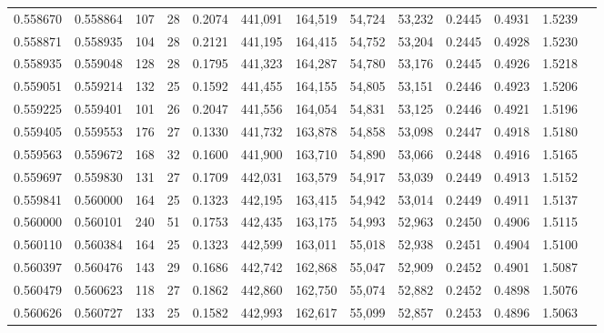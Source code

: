 \begin{tabular}{rrrrrrrrrrrrr}
0.558670 & 0.558864 &    107 &    28 &                                     0.2074 & 441,091 & 164,519 &  54,724 &  53,232 & 0.2445 & 0.4931 & 1.5239 \\
0.558871 & 0.558935 &    104 &    28 &                                     0.2121 & 441,195 & 164,415 &  54,752 &  53,204 & 0.2445 & 0.4928 & 1.5230 \\
0.558935 & 0.559048 &    128 &    28 &                                     0.1795 & 441,323 & 164,287 &  54,780 &  53,176 & 0.2445 & 0.4926 & 1.5218 \\
0.559051 & 0.559214 &    132 &    25 &                                     0.1592 & 441,455 & 164,155 &  54,805 &  53,151 & 0.2446 & 0.4923 & 1.5206 \\
0.559225 & 0.559401 &    101 &    26 &                                     0.2047 & 441,556 & 164,054 &  54,831 &  53,125 & 0.2446 & 0.4921 & 1.5196 \\
0.559405 & 0.559553 &    176 &    27 &                                     0.1330 & 441,732 & 163,878 &  54,858 &  53,098 & 0.2447 & 0.4918 & 1.5180 \\
0.559563 & 0.559672 &    168 &    32 &                                     0.1600 & 441,900 & 163,710 &  54,890 &  53,066 & 0.2448 & 0.4916 & 1.5165 \\
0.559697 & 0.559830 &    131 &    27 &                                     0.1709 & 442,031 & 163,579 &  54,917 &  53,039 & 0.2449 & 0.4913 & 1.5152 \\
0.559841 & 0.560000 &    164 &    25 &                                     0.1323 & 442,195 & 163,415 &  54,942 &  53,014 & 0.2449 & 0.4911 & 1.5137 \\
0.560000 & 0.560101 &    240 &    51 &                                     0.1753 & 442,435 & 163,175 &  54,993 &  52,963 & 0.2450 & 0.4906 & 1.5115 \\
0.560110 & 0.560384 &    164 &    25 &                                     0.1323 & 442,599 & 163,011 &  55,018 &  52,938 & 0.2451 & 0.4904 & 1.5100 \\
0.560397 & 0.560476 &    143 &    29 &                                     0.1686 & 442,742 & 162,868 &  55,047 &  52,909 & 0.2452 & 0.4901 & 1.5087 \\
0.560479 & 0.560623 &    118 &    27 &                                     0.1862 & 442,860 & 162,750 &  55,074 &  52,882 & 0.2452 & 0.4898 & 1.5076 \\
0.560626 & 0.560727 &    133 &    25 &                                     0.1582 & 442,993 & 162,617 &  55,099 &  52,857 & 0.2453 & 0.4896 & 1.5063 \\

\end{tabular}
